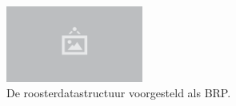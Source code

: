 \begin{figure}
  \centering
  \includegraphics[width=0.4\textwidth]{./img/raw/placeholder.png}
  \caption{De roosterdatastructuur voorgesteld als BRP.}
  \label{fig:hs-datastructuur-grid-bsp}
\end{figure}
